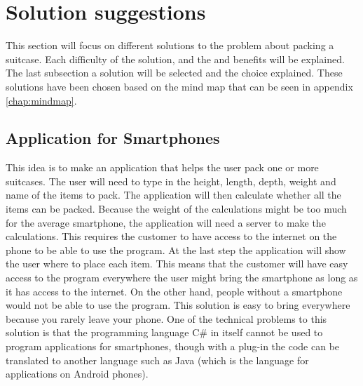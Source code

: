\section{Solution suggestions} 	
This section will focus on different solutions to the problem about packing a suitcase. Each difficulty of the solution, and the and benefits will be explained. The last subsection a solution will be selected and the choice explained. These solutions have been chosen based on the mind map that can be seen in appendix  \ref{chap:mindmap}.

\subsection{Application for Smartphones}
This idea is to make an application that helps the user pack one or more suitcases. The user will need to type in the height, length, depth, weight and name of the items to pack. The application will then calculate whether all the items can be packed. Because the weight of the calculations might be too much for the average smartphone, the application will need a server to make the calculations. This requires the customer to have access to the internet on the phone to be able to use the program. At the last step the application will show the user where to place each item. This means that the customer will have easy access to the program everywhere the user might bring the smartphone as long as it has access to the internet. On the other hand, people without a smartphone would not be able to use the program. This solution is easy to bring everywhere because you rarely leave your phone. One of the technical problems to this solution is that the programming language C\# in itself cannot be used to program applications for smartphones, though with a plug-in the code can be translated to another language such as Java (which is the language for applications on Android phones).

